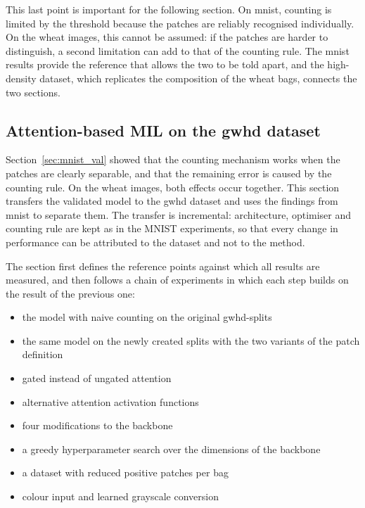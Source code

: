 \documentclass[12pt,parskip = half, DIV=classic,listof=totoc]{scrartcl}
\begin{document}
			This last point is important for the following section. On \ac{mnist}, counting is
			limited by the threshold because the patches are reliably recognised individually.
			On the wheat images, this cannot be assumed: if the patches are harder to
			distinguish, a second limitation can add to that of the counting rule. The
			\ac{mnist} results provide the reference that allows the two to be told apart, and
			the high-density dataset, which replicates the composition of the wheat bags,
			connects the two sections.

		\subsection{Attention-based MIL on the \acs*{gwhd} dataset}\label{sec:gwhd_results}
			Section~\ref{sec:mnist_val} showed that the counting mechanism works when the patches are clearly separable, and that the 
			remaining error is caused by the counting rule. On the wheat images, both effects occur together. This 
			section transfers the validated model to the \ac{gwhd} dataset and uses the findings from \ac{mnist} to separate them. 
			The transfer is incremental: architecture,
			optimiser and counting rule are kept as in the MNIST experiments, so that every change
			in performance can be attributed to the dataset and not to the method.

			The section first defines the reference points against which all results are
			measured, and then follows a chain of experiments in which each step builds on the
			result of the previous one:
			\begin{itemize}
				\item the model with naive counting on the original \acs*{gwhd}-splits
				\item the same model on the newly created splits with the two variants of the patch definition
				\item gated instead of ungated attention
				\item alternative attention activation functions
				\item four modifications to the backbone 
				\item a greedy hyperparameter search over the dimensions of the backbone
				\item a dataset with reduced positive patches per bag
				\item colour input and learned grayscale conversion
			\end{itemize}
\end{document}
